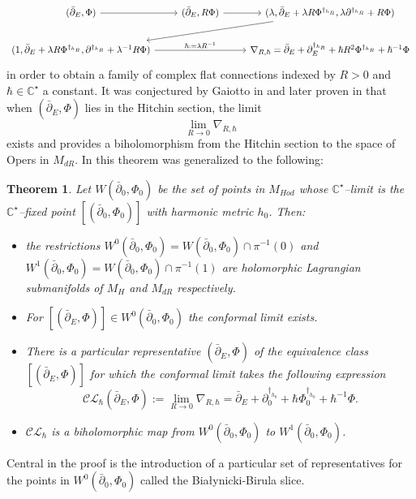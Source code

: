 \documentclass[12pt,oneside,reqno]{amsart}
\newtheorem{theorem}{Theorem}
\theoremstyle{definition}
\numberwithin{equation}{section}
\numberwithin{theorem}{section}
\newcommand{\C}{\mathbb{C}}
\newcommand{\pa}{\partial}
\begin{document}
%
\begin{equation}\label{snake}
\begin{tikzcd}
(\bar\pa_E,\Phi) \arrow{r} &
(\bar\pa_E,R\Phi) \arrow{r} &
(\lambda, \bar\pa_E+ \lambda R\Phi^{\dagger_{h_R}}, \lambda\pa^{\dagger_{h_R}}+R\Phi) \arrow{dll} \\
(1, \bar\pa_E+ \lambda R\Phi^{\dagger_{h_R}}, \pa^{\dagger_{h_R}}+\lambda^{-1}R\Phi) \arrow{rr}{\hbar:=\lambda R^{-1}}
& &\nabla_{R,\hbar} = \bar\pa_E+ \pa_E^{\dagger_{h_R}} + \hbar R^2\Phi^{\dagger_{h_R}} +\hbar^{-1}\Phi
\end{tikzcd}
\end{equation}
%
in order to obtain a family of complex flat connections indexed by $R>0$ and $\hbar\in \C^{\star}$ a constant. It was conjectured by Gaiotto in \cite{Gaiotto} and later proven in \cite{DFKMMN} that when $(\bar\pa_E,\Phi)$ lies in the Hitchin section, the limit 
%
\begin{equation*}
\lim\limits_{R\to 0 } \nabla_{R,\hbar}
\end{equation*}
%
exists and provides a biholomorphism from the Hitchin section to the space of Opers in $M_{dR}$. In \cite{CW} this theorem was generalized to the following:
%
\begin{theorem}
Let $W(\bar\pa_0,\Phi_0)$ be the set of points in $M_{Hod}$ whose $\C^{\star}$--limit is the $\C^{\star}$--fixed point $[(\bar\pa_0,\Phi_0)]$ with harmonic metric $h_0$. Then:
%
\begin{itemize}
\item the restrictions $W^0(\bar\pa_0,\Phi_0) = W(\bar\pa_0,\Phi_0)\cap\pi^{-1}(0)$ and $W^1(\bar\pa_0,\Phi_0) = W(\bar\pa_0,\Phi_0)\cap \pi^{-1}(1)$ are holomorphic Lagrangian submanifolds of $M_H$ and $M_{dR}$ respectively. 
\item For $[(\bar\pa_E,\Phi)]\in W^0(\bar\pa_0,\Phi_0)$ the conformal limit exists. 
\item There is a particular representative $(\bar\pa_E,\Phi)$ of the equivalence class $[(\bar\pa_E,\Phi)]$ for which the conformal limit takes the following expression
%
\begin{equation}\label{HCM}
\mathcal {CL}_{\hbar}(\bar\pa_E,\Phi) := \lim\limits_{R\to 0} \nabla_{R,\hbar} = \bar\pa_E + \pa_0^{\dagger_{h_0}} + \hbar\Phi_0^{\dagger_{h_0}} + \hbar^{-1}\Phi.
\end{equation}
%
\item $\mathcal {CL}_{\hbar}$ is a biholomorphic map from $W^0(\bar\pa_0,\Phi_0)$ to $W^1(\bar\pa_0,\Phi_0)$. 
\end{itemize}
\end{theorem}
%
Central in the proof is the introduction of a particular set of representatives for the points in $W^0(\bar\pa_0,\Phi_0)$ called the Bia\l{}ynicki-Birula slice. 
\end{document}

